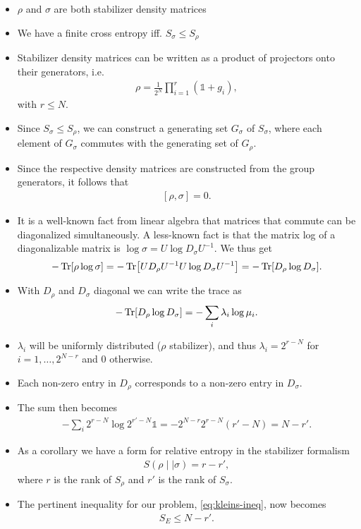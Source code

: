 \begin{itemize}
  \item $\rho$ and $\sigma$ are both stabilizer density matrices
  \item We have a finite cross entropy iff. $S_\sigma \leq S_\rho$
  \item Stabilizer density matrices can be written as a product of projectors
    onto their generators, i.e.
    \begin{align}
    \rho = \frac{1}{2^N}\prod_{i=1}^r \left(\mathds{1} + g_i\right)
    ,\end{align}
    with $r\leq N$.
  \item Since $S_\sigma \leq S_\rho$, we can construct a generating set
    $G_\sigma$ of $S_\sigma$, where each element of $G_\sigma$ commutes with
    the generating set of $G_\rho$.
  \item Since the respective density matrices are constructed from the group
    generators, it follows that
    \begin{align}
      \left[\rho, \sigma\right] = 0
    .\end{align}
  \item It is a well-known fact from linear algebra that matrices that commute
    can be diagonalized simultaneously. A less-known fact is that the matrix
    log of a diagonalizable matrix is $\log\sigma = U \log D_\sigma U^{-1}$. We
    thus get
    \begin{align}
      -\Tr[\rho \log\sigma] = -\Tr[U D_\rho U^{-1} U \log D_\sigma U^{-1}] =
      -\Tr[D_\rho \log D_\sigma] 
    .\end{align}
  \item With $D_\rho$ and $D_\sigma$ diagonal we can write the trace as
    \begin{align}
      -\Tr[D_\rho \log D_\sigma] = -\sum_i \lambda_i \log \mu_i
    .\end{align}
  \item $\lambda_i$ will be uniformly distributed ($\rho$ stabilizer), and thus
    $\lambda_i = 2^{r-N}$ for $i=1,\ldots,2^{N-r}$ and $0$ otherwise.
  \item Each non-zero entry in $D_\rho$ corresponds to a non-zero entry in
    $D_\sigma$. 
  \item The sum then becomes
    \begin{align}
      -\sum_i 2^{r-N} \log 2^{r'-N} \mathds{1} =
      -2^{N-r}2^{r-N}\left(r'-N\right)= N-r'
    .\end{align}
  \item As a corollary we have a form for relative entropy in the stabilizer
    formalism
    \begin{align}
      S(\rho \mid\mid \sigma) = r - r'
    ,\end{align}
    where $r$ is the rank of $S_\rho$ and $r'$ is the rank of $S_\sigma$.
  \item The pertinent inequality for our problem, \cref{eq:kleins-ineq}, now
    becomes
    \begin{align}
      S_E \leq N-r'
    .\end{align}
\end{itemize}


